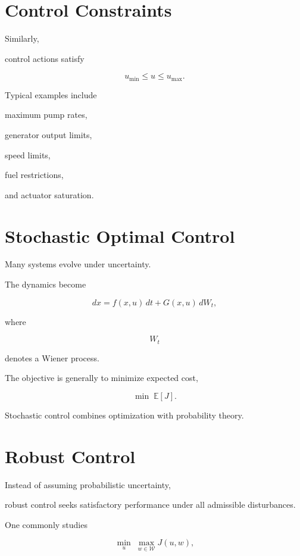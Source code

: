 \documentclass[11pt,fleqn]{book}
\numberwithin{equation}{chapter}
\theoremstyle{plain}
\theoremstyle{definition}
\theoremstyle{remark}
\begin{document}

\section{Control Constraints}

Similarly,

control actions satisfy

\[
u_{\min}
\le
u
\le
u_{\max}.
\]

Typical examples include

maximum pump rates,

generator output limits,

speed limits,

fuel restrictions,

and actuator saturation.


\section{Stochastic Optimal Control}

Many systems evolve under uncertainty.

The dynamics become

\[
dx
=
f(x,u)\,dt
+
G(x,u)\,dW_t,
\]

where

\[
W_t
\]

denotes a Wiener process.

The objective is generally to minimize expected cost,

\[
\boxed{
\min
\;
\mathbb E[J].
}
\]

Stochastic control combines optimization with probability theory.


\section{Robust Control}

Instead of assuming probabilistic uncertainty,

robust control seeks satisfactory performance under all admissible
disturbances.

One commonly studies

\[
\boxed{
\min_u
\;
\max_{w\in\mathcal W}
J(u,w),
}
\]
\end{document}
